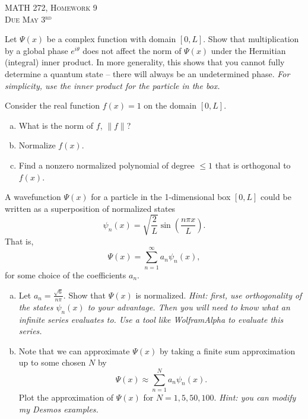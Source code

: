 \documentclass[12pt]{article} %
\begin{document}
\begin{center}
   \textsc{\large MATH 272, Homework 9}\\
   \textsc{Due May 3$^\textrm{rd}$}
\end{center}
\vspace{.5cm}


\begin{problem}
	Let $\Psi(x)$ be a complex function with domain $[0,L]$.  Show that multiplication by a global phase $e^{i\theta}$ does not affect the norm of $\Psi(x)$ under the Hermitian (integral) inner product. In more generality, this shows that you cannot fully determine a quantum state -- there will always be an undetermined phase. \emph{For simplicity, use the inner product for the particle in the box.}
\end{problem}

\begin{problem}
	Consider the real function $f(x)=1$ on the domain $[0,L]$.
	\begin{enumerate}[(a)]
		\item What is the norm of $f$, $\|f\|$?
		\item Normalize $f(x)$.
		\item Find a nonzero normalized polynomial of degree $\leq 1$ that is orthogonal to $f(x)$.
	\end{enumerate}
\end{problem}

\begin{problem}
	A wavefunction $\Psi(x)$ for a particle in the 1-dimensional box $[0,L]$ could be written as a superposition of normalized states
	\[
	\psi_n(x) = \sqrt{\frac{2}{L}} \sin\left(\frac{n\pi x}{L}\right).
	\]
	That is,
	\[
	\Psi(x) = \sum_{n=1}^\infty a_n \psi_n(x),
	\]
	for some choice of the coefficients $a_n$.
	\begin{enumerate}[(a)]
		\item Let $a_n = \frac{\sqrt{6}}{n\pi}$. Show that $\Psi(x)$ is normalized. \emph{Hint: first, use orthogonality of the states $\psi_n(x)$ to your advantage. Then you will need to know what an infinite series evaluates to. Use a tool like WolframAlpha to evaluate this series.}
		\item Note that we can approximate $\Psi(x)$ by taking a finite sum approximation up to some chosen $N$ by
		\[
			\Psi(x) \approx \sum_{n=1}^N a_n \psi_n(x).
		\]
		Plot the approximation of $\Psi(x)$ for $N=1,5,50,100$.  \emph{Hint: you can modify my Desmos examples.}
		\end{enumerate}
\end{problem}
\end{document}
